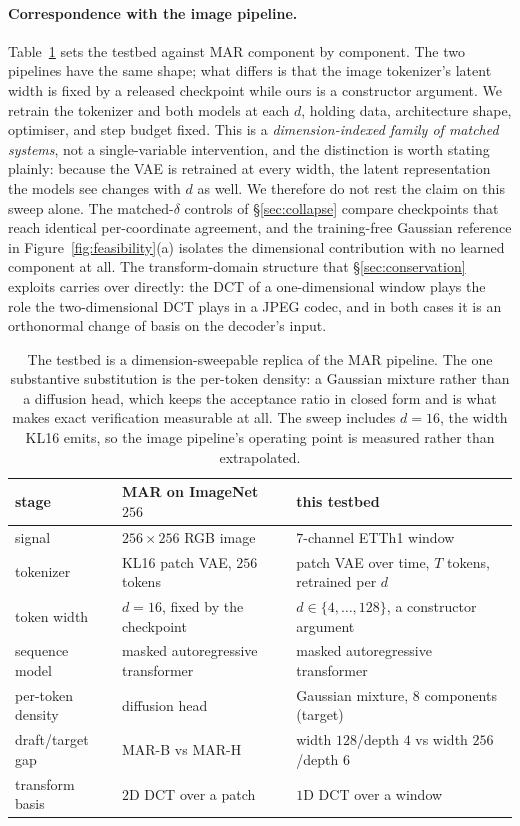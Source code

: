 \documentclass[10pt]{article}
\newcommand{\dd}{d}
\begin{document}
\paragraph{Correspondence with the image pipeline.} Table~\ref{tab:correspondence} sets the testbed
against MAR component by component. The two pipelines have the same shape; what differs is that the
image tokenizer's latent width is fixed by a released checkpoint while ours is a constructor
argument. We retrain the tokenizer and both models at each $\dd$, holding data, architecture shape,
optimiser, and step budget fixed. This is a \emph{dimension-indexed family of matched systems}, not a
single-variable intervention, and the distinction is worth stating plainly: because the VAE is
retrained at every width, the latent representation the models see changes with $\dd$ as well. We
therefore do not rest the claim on this sweep alone. The matched-$\delta$ controls of
\S\ref{sec:collapse} compare checkpoints that reach identical per-coordinate agreement, and the
training-free Gaussian reference in Figure~\ref{fig:feasibility}(a) isolates the dimensional
contribution with no learned component at all. The transform-domain structure that
\S\ref{sec:conservation} exploits carries over directly: the DCT of a one-dimensional window plays
the role the two-dimensional DCT plays in a JPEG codec, and in both cases it is an orthonormal
change of basis on the decoder's input.

\begin{table}[t]
\centering
\small
\begin{tabular}{lll}
\toprule
stage & MAR on ImageNet $256$ & this testbed \\
\midrule
signal & $256 \times 256$ RGB image & $7$-channel ETTh1 window \\
tokenizer & KL16 patch VAE, $256$ tokens & patch VAE over time, $T$ tokens, retrained per $\dd$ \\
token width & $\dd = 16$, fixed by the checkpoint & $\dd \in \{4,\dots,128\}$, a constructor argument \\
sequence model & masked autoregressive transformer & masked autoregressive transformer \\
per-token density & diffusion head & Gaussian mixture, $8$ components (target) \\
draft/target gap & MAR-B vs MAR-H & width $128$/depth $4$ vs width $256$/depth $6$ \\
transform basis & $2$D DCT over a patch & $1$D DCT over a window \\
\bottomrule
\end{tabular}
\caption{The testbed is a dimension-sweepable replica of the MAR pipeline. The one substantive
substitution is the per-token density: a Gaussian mixture rather than a diffusion head, which keeps
the acceptance ratio in closed form and is what makes exact verification measurable at all. The sweep
includes $\dd = 16$, the width KL16 emits, so the image pipeline's operating point is measured rather
than extrapolated.}
\label{tab:correspondence}
\end{table}
\end{document}
